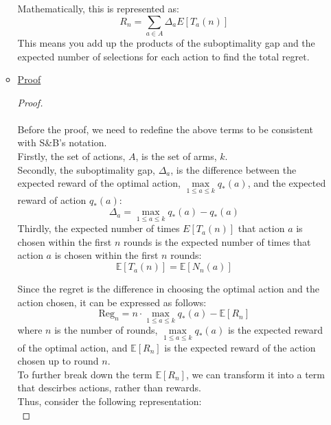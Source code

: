 \documentclass{article}
\begin{document}
\begin{enumerate}[a)]
\begin{itemize}
        Mathematically, this is represented as:
        \[ R_n = \sum_{a \in A} \Delta_a E[T_a(n)] \]
        This means you add up the products of the suboptimality gap and the expected number of selections for each action to find the total regret.

        \item \underline{Proof}
        \begin{proof}
            \renewcommand{\qedsymbol}{$\blacksquare$}
            \hfill\\\\
            Before the proof, we need to redefine the above terms to be consistent with S\&B's notation.\\
            Firstly, the set of actions, $A$, is the set of arms, $k$.\\
            Secondly, the suboptimality gap, $\Delta_a$, is the difference between the expected reward of the optimal action, $\underset{1\leq a \leq k}{\max} q_{*}(a)$, and the expected reward of action $q_{*}(a)$: 
            \begin{equation*}
                \Delta_a = \underset{1\leq a \leq k}{\max} q_{*}(a) - q_{*}(a)
            \end{equation*}
            Thirdly, the expected number of times $E[T_a(n)]$ that action $a$ is chosen within the first $n$ rounds is the expected number of times that action $a$ is chosen within the first $n$ rounds:
            \begin{equation*}
                \mathbb{E}[T_a(n)] = \mathbb{E}[N_{n}(a)]
            \end{equation*}\par 
            Since the regret is the difference in choosing the optimal action and the action chosen, it can be expressed as follows:
            \begin{equation*}
                \text{Reg}_{n} = n \cdot \underset{1\leq a \leq k}{\max} q_{*}(a) - \mathbb{E}[R_{n}]
            \end{equation*}
            where $n$ is the number of rounds, $\underset{1\leq a \leq k}{\max} q_{*}(a)$ is the expected reward of the optimal action, and $\mathbb{E}[R_{n}]$ is the expected reward of the action chosen up to round $n$.\\
            To further break down the term $\mathbb{E}[R_{n}]$, we can transform it into a term that descirbes actions, rather than rewards.\\
            Thus, consider the following representation:
            \begin{equation*}

\end{equation*}
\end{proof}
\end{itemize}
\end{enumerate}
\end{document}
